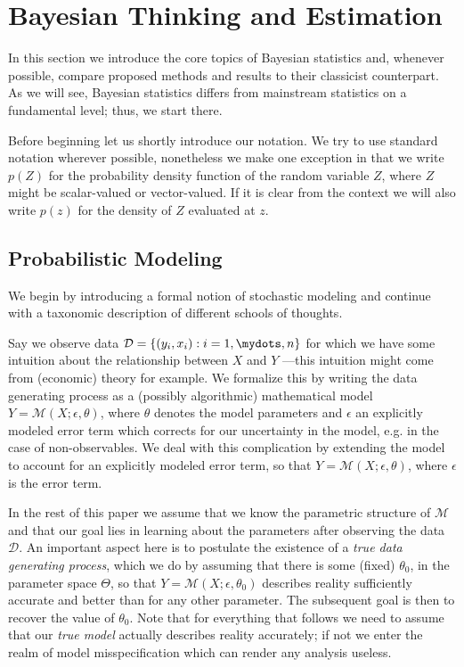 \section{Bayesian Thinking and Estimation}
In this section we introduce the core topics of Bayesian statistics and, whenever possible, compare proposed methods and results to their classicist counterpart.
As we will see, Bayesian statistics differs from mainstream statistics on a fundamental level; thus, we start there.

Before beginning let us shortly introduce our notation.
We try to use standard notation wherever possible, nonetheless we make one exception in that we write $p(Z)$ for the probability density function of the random variable $Z$, where $Z$ might be scalar-valued or vector-valued.
If it is clear from the context we will also write $p(z)$ for the density of $Z$ evaluated at $z$.

\subsection{Probabilistic Modeling}
We begin by introducing a formal notion of stochastic modeling and continue with a taxonomic description of different schools of thoughts.

Say we observe data $\mathcal{D} = \{(y_i, x_i) : i=1,\mydots,n\}$ for which we have some intuition about the relationship between $X$ and $Y$ ---this intuition might come from (economic) theory for example.
We formalize this by writing the data generating process as a (possibly algorithmic) mathematical model $Y = \mathcal{M}(X; \epsilon, \theta)$, where $\theta$ denotes the model parameters and $\epsilon$ an explicitly modeled error term which corrects for our uncertainty in the model, e.g. in the case of non-observables.
We deal with this complication by extending the model to account for an explicitly modeled error term, so that $Y = \mathcal{M}(X; \epsilon, \theta)$, where $\epsilon$ is the error term.

In the rest of this paper we assume that we know the parametric structure of $\mathcal{M}$ and that our goal lies in learning about the parameters after observing the data $\mathcal{D}$.
An important aspect here is to postulate the existence of a \textit{true data generating process}, which we do by assuming that there is some (fixed) $\theta_0$, in the parameter space $\Theta$, so that $Y = \mathcal{M}(X; \epsilon, \theta_0)$ describes reality sufficiently accurate and better than for any other parameter.
The subsequent goal is then to recover the value of $\theta_0$.
Note that for everything that follows we need to assume that our \emph{true model} actually describes reality accurately; if not we enter the realm of model misspecification which can render any analysis useless.

